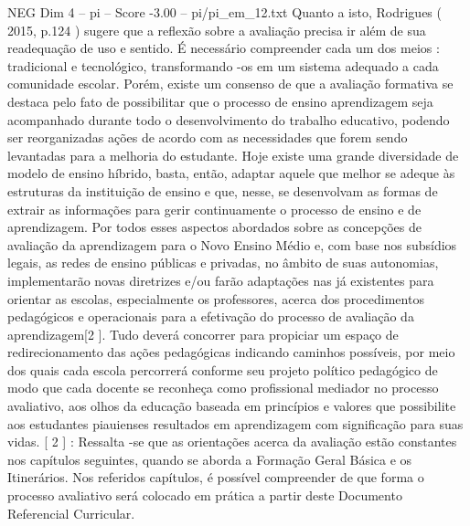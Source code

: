 \begin{textsample}{NEG Dim 4 – pi – Score -3.00 – pi/pi\_em\_12.txt}
Quanto a isto, Rodrigues ( 2015, p.124 ) sugere que a reflexão sobre a avaliação precisa ir além de sua readequação de uso e sentido.
É necessário compreender cada um dos meios : tradicional e tecnológico, transformando -os em um sistema adequado a cada comunidade escolar.
Porém, existe um consenso de que a avaliação formativa se destaca pelo fato de possibilitar que o processo de ensino aprendizagem seja acompanhado durante todo o desenvolvimento do trabalho educativo, podendo ser reorganizadas ações de acordo com as necessidades que forem sendo levantadas para a melhoria do estudante.
Hoje existe uma grande diversidade de modelo de ensino híbrido, basta, então, adaptar aquele que melhor se adeque às estruturas da instituição de ensino e que, nesse, se desenvolvam as formas de extrair as informações para gerir continuamente o processo de ensino e de aprendizagem.
Por todos esses aspectos abordados sobre as concepções de avaliação da aprendizagem para o Novo Ensino Médio e, com base nos subsídios legais, as redes de ensino públicas e privadas, no âmbito de suas autonomias, implementarão novas diretrizes e/ou farão adaptações nas já existentes para orientar as escolas, especialmente os professores, acerca dos procedimentos pedagógicos e operacionais para a efetivação do processo de avaliação da aprendizagem[2 ].
Tudo deverá concorrer para propiciar um espaço de redirecionamento das ações pedagógicas indicando caminhos possíveis, por meio dos quais cada escola percorrerá conforme seu projeto político pedagógico de modo que cada docente se reconheça como profissional mediador no processo avaliativo, aos olhos da educação baseada em princípios e valores que possibilite aos estudantes piauienses resultados em aprendizagem com significação para suas vidas. [ 2 ] : Ressalta -se que as orientações acerca da avaliação estão constantes nos capítulos seguintes, quando se aborda a Formação Geral Básica e os Itinerários.
Nos referidos capítulos, é possível compreender de que forma o processo avaliativo será colocado em prática a partir deste Documento Referencial Curricular.

\end{textsample}
